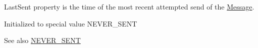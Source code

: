 LastSent property is the time of the most recent attempted send of the \hyperlink{classPseudoTcp_1_1Message}{Message}. 

Initialized to special value NEVER\_\-SENT \begin{DoxySeeAlso}{See also}
\hyperlink{classPseudoTcp_1_1Message_a28f26b18c79f0081d076b4ff521cea37}{NEVER\_\-SENT} 
\end{DoxySeeAlso}
